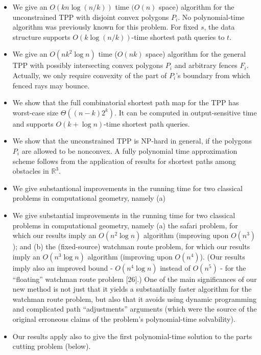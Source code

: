 \documentclass[a4paper]{article}
\begin{document}
\begin{itemize}

	\item We give an \(O(k n \log(n / k))\) time \((O(n)\) space) algorithm for the unconstrained TPP with disjoint convex polygons \(P_i\). No polynomial-time algorithm was previously known for this problem. For fixed \(s\), the data structure supports \(O(k \log(n / k))\)-time shortest path queries to \(t\).
	
	\item We give an \(O(n k ^ 2 \log n)\) time (\(O(nk)\) space) algorithm for the general TPP with possibly intersecting convex polygons \(P_i\) and arbitrary fences \(F_i\). Actually, we only require convexity of the part of \(P_i\)'s boundary from which fenced rays may bounce.

	\item We show that the full combinatorial shortest path map for the TPP has worst-case size \(\Theta((n - k) 2 ^ k)\). It can be computed in output-sensitive time and supports \(O(k + \log n)\)-time shortest path queries.
	
	\item We show that the unconstrained TPP is NP-hard in general, if the polygons \(P_i\) are allowed to be nonconvex. A fully polynomial time approximation scheme follows from the application of results for shortest paths among obstacles in \(\mathbb{R} ^ 3\).

	\item We give substantional improvements in the running time for two classical problems in computational geometry, namely (a) 

	\item We give substantial improvements in the running time for two classical problems in computational geometry, namely (a) the safari problem, for which our results imply an \(O(n ^ 2 \log n)\) algorithm (improving upon \(O(n ^ 3)\)); and (b) the (fixed-source) watchman route problem, for which our results imply an \(O(n ^ 3 \log n)\) algorithm (improving upon \(O(n ^ 4)\)). (Our results imply also an improved bound - \(O(n ^ 4 \log n)\) instead of \(O(n ^ 5)\) - for the “floating” watchman route problem [26].) One of the main significances of our new method is not just that it yields a substantially faster algorithm for the watchman route problem, but also that it avoids using dynamic programming and complicated path “adjustments” arguments (which were the source of the original erroneous claims of the problem's polynomial-time solvability).
	
	\item Our results apply also to give the first polynomial-time solution to the parts cutting problem (below).

\end{itemize}
\end{document}
